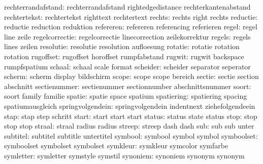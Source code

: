   rechterrandafstand:  rechterrandafstand   rightedgedistance    rechterkantenabstand
        rechtertekst:  rechtertekst         righttext            rechtertext
              rechts:  rechts               right                rechts
            reductie:  reductie             reduction            reduktion
           refereren:  refereren            referencing          referieren
               regel:  regel                line                 zeile
      regelcorrectie:  regelcorrectie       linecorrection       zeilekorrektur
              regels:  regels               lines                zeilen
           resolutie:  resolutie            resolution           aufloesung
             rotatie:  rotatie              rotation             rotation
           rugoffset:  rugoffset            horoffset            rumpfabstand
              rugwit:  rugwit               backspace            rumpfspatium
              schaal:  schaal               scale                format
            scheider:  scheider             separator            seperator
              scherm:  scherm               display              bildschirm
               scope:  scope                scope                bereich
              sectie:  sectie               section              abschnitt
        sectienummer:  sectienummer         sectionnumber        abschnittsnummer
               soort:  soort                family               familie
              spatie:  spatie               space                spatium
          spatiering:  spatiering           spacing              spatiumausgleich
    springvolgendein:  springvolgendein     indentnext           ziehefolgendeein
                stap:  stap                 step                 schritt
               start:  start                start                start
              status:  status               state                status
                stop:  stop                 stop                 stop
              straal:  straal               radius               radius
              streep:  streep               dash                 dash %
                 sub:  sub                  sub                  unter
            subtitel:  subtitel             subtitle             untertitel
             symbool:  symbool              symbol               symbol
          symboolset:  symboolset           symbolset            symbolset 
            symkleur:  symkleur             symcolor             symfarbe
           symletter:  symletter            symstyle             symstil
            synoniem:  synoniem             synonym              synonym
